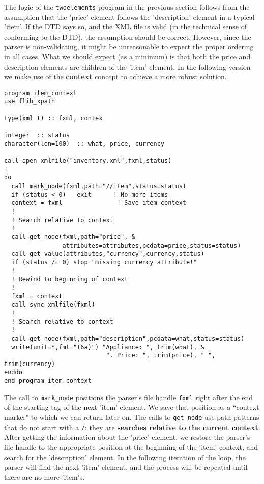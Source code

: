 \documentclass[11pt]{article}
\begin{document}
The logic of the \texttt{twoelements} program in the previous section
 follows from the assumption that the 'price' element follows the
 'description' element in a typical 'item'. If the DTD says so, and
 the XML file is valid (in the technical sense of conforming to the
 DTD), the assumption should be correct. However, since the parser is
 non-validating, it might be unreasonable to expect the proper
 ordering in all cases. What we should expect (as a minimum) is that
 both the price and description elements are children of the 'item'
 element. In the following version we make use of the \textbf{context}
 concept to achieve a more robust solution.
%
\begin{verbatim}
program item_context
use flib_xpath

type(xml_t) :: fxml, contex

integer  :: status
character(len=100)  :: what, price, currency

call open_xmlfile("inventory.xml",fxml,status)
!
do
  call mark_node(fxml,path="//item",status=status)
  if (status < 0)   exit      ! No more items
  context = fxml               ! Save item context   
  !
  ! Search relative to context
  !
  call get_node(fxml,path="price", &
                attributes=attributes,pcdata=price,status=status)
  call get_value(attributes,"currency",currency,status)
  if (status /= 0) stop "missing currency attribute!"
  !
  ! Rewind to beginning of context
  !
  fxml = context
  call sync_xmlfile(fxml)  
  !
  ! Search relative to context
  !
  call get_node(fxml,path="description",pcdata=what,status=status)
  write(unit=*,fmt="(6a)") "Appliance: ", trim(what), &
                            ". Price: ", trim(price), " ", trim(currency)
enddo
end program item_context
\end{verbatim}
%
The call to \texttt{mark\_node} positions the parser's file handle
\texttt{fxml} right after the end of the starting tag of the next
'item' element. We save that position as a ``context marker" to which
we can return later on. The calls to \texttt{get\_node} use path
patterns that do not start with a \texttt{/}: they are
\textbf{searches relative to the current context}. After getting the
information about the 'price' element, we restore the parser's file
handle to the appropriate position at the beginning of the 'item'
context, and search for the 'description' element. In the following
iteration of the loop, the parser will find the next 'item' element,
and the process will be repeated until there are no more 'item's.
\end{document}
